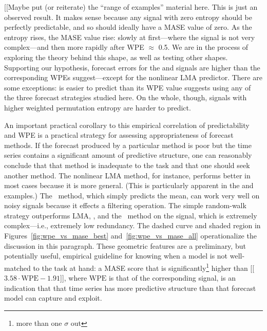 [[Maybe put (or reiterate) the ``range of examples'' material here.
    This is just an observed result.  It makes sense because any
    signal with zero entropy should be perfectly predictable, and so
    should ideally have a MASE value of zero.  As the entropy rises,
    the MASE value rise: slowly at first---where the signal is not
    very complex---and then more rapidly after WPE $\approx$ 0.5.  We
    are in the process of exploring the theory behind this shape, as
    well as testing other shapes.  Supporting our hypothesis, forecast
    errors for the \col and \svdfive signals are higher than the
    corresponding WPEs suggest---except for the nonlinear LMA
    predictor.  There are some exceptions: \svdone is easier to
    predict than its WPE value suggests using any of the three
    forecast strategies studied here.  On the whole, though, signals
    with higher weighted permutation entropy are harder to predict.


An important practical corollary to this empirical correlation of
predictability and WPE is a practical strategy for assessing
appropriateness of forecast methods.  If the forecast produced by a
particular method is poor but the time series contains a significant
amount of predictive structure, one can reasonably conclude that that
method is inadequate to the task and that one should seek another
method.  The nonlinear LMA method, for instance, performs better in
most cases because it is more general.  (This is particularly apparent
in the \col and \svdfive examples.)
The \naive ~method, which simply predicts the mean, can work very well
on noisy signals because it effects a filtering operation.  The simple
random-walk strategy outperforms LMA, \arima, and the \naive
~method on the \gcc signal, which is extremely complex---i.e.,
extremely low redundancy.
The dashed curve and shaded region in
Figures~\ref{fig:wpe_vs_mase_best} and~\ref{fig:wpe_vs_mase_all}
operationalize the discussion in this paragraph.  These geometric
features are a preliminary, but potentially useful, empirical
guideline for knowing when a model is not well-matched to the task at
hand: a MASE score that is significantly\footnote{more than one
  $\sigma$ out} higher than [[$3.58 \cdot \mathrm{WPE} - 1.91$]],
where $\mathrm{WPE}$ is that of the corresponding signal, is an
indication that that time series has more predictive structure than
that forecast model can capture and exploit.

